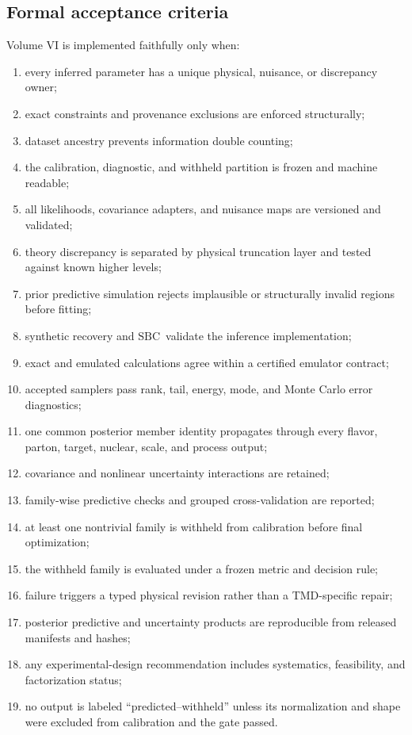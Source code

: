 \documentclass[11pt]{article}
\newcommand{\SBC}{\ensuremath{\mathrm{SBC}}}
\begin{document}
\subsection{Formal acceptance criteria}

Volume VI is implemented faithfully only when:
\begin{enumerate}
\item every inferred parameter has a unique physical, nuisance, or discrepancy
owner;
\item exact constraints and provenance exclusions are enforced structurally;
\item dataset ancestry prevents information double counting;
\item the calibration, diagnostic, and withheld partition is frozen and
machine readable;
\item all likelihoods, covariance adapters, and nuisance maps are versioned and
validated;
\item theory discrepancy is separated by physical truncation layer and tested
against known higher levels;
\item prior predictive simulation rejects implausible or structurally invalid
regions before fitting;
\item synthetic recovery and \SBC\ validate the inference implementation;
\item exact and emulated calculations agree within a certified emulator
contract;
\item accepted samplers pass rank, tail, energy, mode, and Monte Carlo error
diagnostics;
\item one common posterior member identity propagates through every flavor,
parton, target, nuclear, scale, and process output;
\item covariance and nonlinear uncertainty interactions are retained;
\item family-wise predictive checks and grouped cross-validation are reported;
\item at least one nontrivial family is withheld from calibration before final
optimization;
\item the withheld family is evaluated under a frozen metric and decision rule;
\item failure triggers a typed physical revision rather than a TMD-specific
repair;
\item posterior predictive and uncertainty products are reproducible from
released manifests and hashes;
\item any experimental-design recommendation includes systematics, feasibility,
and factorization status;
\item no output is labeled ``predicted--withheld'' unless its normalization and
shape were excluded from calibration and the gate passed.
\end{enumerate}
\end{document}
